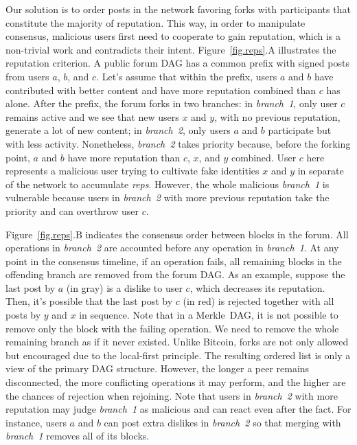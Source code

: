 \documentclass[10pt,journal,compsoc]{IEEEtran}
\newcommand{\reps}     {\emph{reps}\xspace}
\begin{document}
Our solution is to order posts in the network favoring forks with participants
that constitute the majority of reputation.
This way, in order to manipulate consensus, malicious users first need to
cooperate to gain reputation, which is a non-trivial work and contradicts their
intent.
%
Figure~\ref{fig.reps}.A illustrates the reputation criterion.
A public forum DAG has a common prefix with signed posts from users $a$, $b$,
and $c$.
Let's assume that within the prefix, users $a$ and $b$ have contributed with
better content and have more reputation combined than $c$ has alone.
%
After the prefix, the forum forks in two branches:
in \emph{branch~1}, only user $c$ remains active and we see that new users $x$
and $y$, with no previous reputation, generate a lot of new content;
in \emph{branch~2}, only users $a$ and $b$ participate but with less activity.
Nonetheless, \emph{branch~2} takes priority because, before the forking point,
$a$ and $b$ have more reputation than $c$, $x$, and $y$ combined.
%
User $c$ here represents a malicious user trying to cultivate fake identities
$x$ and $y$ in separate of the network to accumulate \reps.
However, the whole malicious \emph{branch~1} is vulnerable because users in
\emph{branch~2} with more previous reputation take the priority and can
overthrow user $c$.

Figure~\ref{fig.reps}.B indicates the consensus order between blocks in the
forum.
All operations in \emph{branch~2} are accounted before any operation in
\emph{branch~1}.
%
At any point in the consensus timeline, if an operation fails, all remaining
blocks in the offending branch are removed from the forum DAG.
As an example, suppose the last post by $a$ (in gray) is a dislike to user $c$,
which decreases its reputation.
Then, it's possible that the last post by $c$ (in red) is rejected together
with all posts by $y$ and $x$ in sequence.
Note that in a Merkle~DAG, it is not possible to remove only the block with the
failing operation.
We need to remove the whole remaining branch as if it never existed.
%
Unlike Bitcoin, forks are not only allowed but encouraged due to the
local-first principle.
The resulting ordered list is only a view of the primary DAG structure.
However, the longer a peer remains disconnected, the more conflicting
operations it may perform, and the higher are the chances of rejection when
rejoining.
%
Note that users in \emph{branch~2} with more reputation may judge
\emph{branch~1} as malicious and can react even after the fact.
For instance, users $a$ and $b$ can post extra dislikes in \emph{branch~2} so
that merging with \emph{branch~1} removes all of its blocks.
\end{document}
